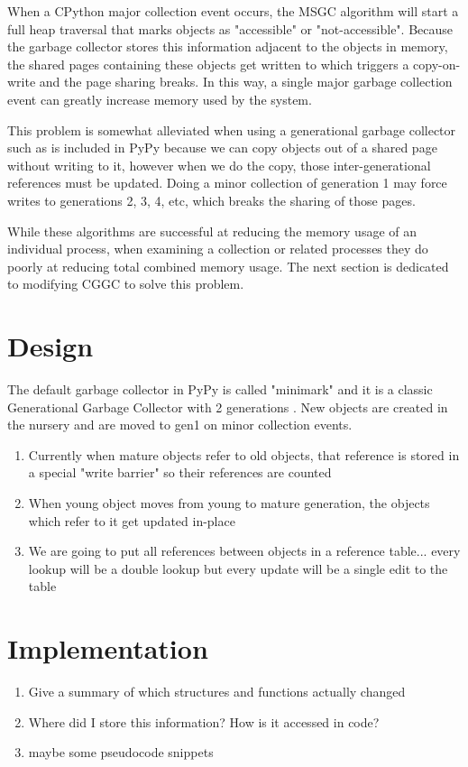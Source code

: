 \documentclass{article}
\begin{document}
When a CPython major collection event occurs, the MSGC algorithm will start a full heap traversal that marks objects as "accessible" or "not-accessible".  Because the garbage collector stores this information adjacent to the objects in memory, the shared pages containing these objects get written to which triggers a copy-on-write and the page sharing breaks.  In this way, a single major garbage collection event can greatly increase memory used by the system.

This problem is somewhat alleviated when using a generational garbage collector such as is included in PyPy because we can copy objects out of a shared page without writing to it, however when we do the copy, those inter-generational references must be updated.  Doing a minor collection of generation 1 may force writes to generations 2, 3, 4, etc, which breaks the sharing of those pages.  

While these algorithms are successful at reducing the memory usage of an individual process, when examining a collection or related processes they do poorly at reducing total combined memory usage.  The next section is dedicated to modifying CGGC to solve this problem.  

\section{Design}\label{sec:design}

The default garbage collector in PyPy is called "minimark" and it is a classic Generational Garbage Collector with 2 generations \cite{pypy-doc}.  New objects are created in the nursery and are moved to gen1 on minor collection events.  

\begin{enumerate}
    \item Currently when mature objects refer to old objects, that reference is stored in a special "write barrier" so their references are counted
    \item When young object moves from young to mature generation, the objects which refer to it get updated in-place
    \item We are going to put all references between objects in a reference table... every lookup will be a double lookup but every update will be a single edit to the table
\end{enumerate}

\section{Implementation}\label{sec:implementation}
\begin{enumerate}
    \item Give a summary of which structures and functions actually changed
    \item Where did I store this information?  How is it accessed in code?  
    \item maybe some pseudocode snippets
\end{enumerate}
\end{document}
